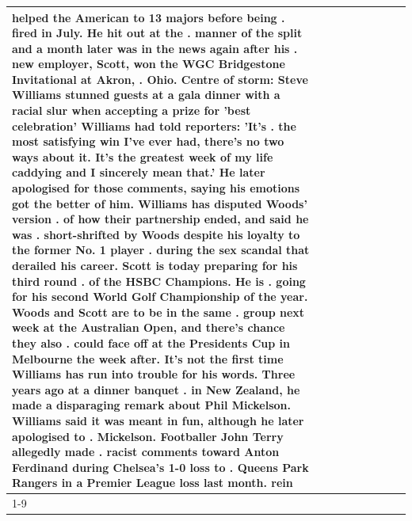 \begin{table}[H]
\begin{tabular}{lllrlllll}
helped the American to 13 majors before being . fired in July. He hit out at the . manner of the split and a month later was in the news again after his . new employer, Scott, won the WGC Bridgestone Invitational at Akron, . Ohio. Centre of storm: Steve Williams stunned guests at a gala dinner with a racial slur when accepting a prize for 'best celebration' Williams had told reporters: 'It's . the most satisfying win I've ever had, there's no two ways about it. It's the greatest week of my life caddying and I sincerely mean that.' He later apologised for those comments, saying his emotions got the better of him. Williams has disputed Woods' version . of how their partnership ended, and said he was . short-shrifted by Woods despite his loyalty to the former No. 1 player . during the sex scandal that derailed his career. Scott is today preparing for his third round . of the HSBC Champions. He is . going for his second World Golf Championship of the year. Woods and Scott are to be in the same . group next week at the Australian Open, and there's chance they also . could face off at the Presidents Cup in Melbourne the week after. It's not the first time Williams has run into trouble for his words. Three years ago at a dinner banquet . in New Zealand, he made a disparaging remark about Phil Mickelson. Williams said it was meant in fun, although he later apologised to . Mickelson. Footballer John Terry allegedly made . racist comments toward Anton Ferdinand during Chelsea's 1-0 loss to . Queens Park Rangers in a Premier League loss last month. rein \\
\cline{1-9}

\end{tabular}
\end{table}
